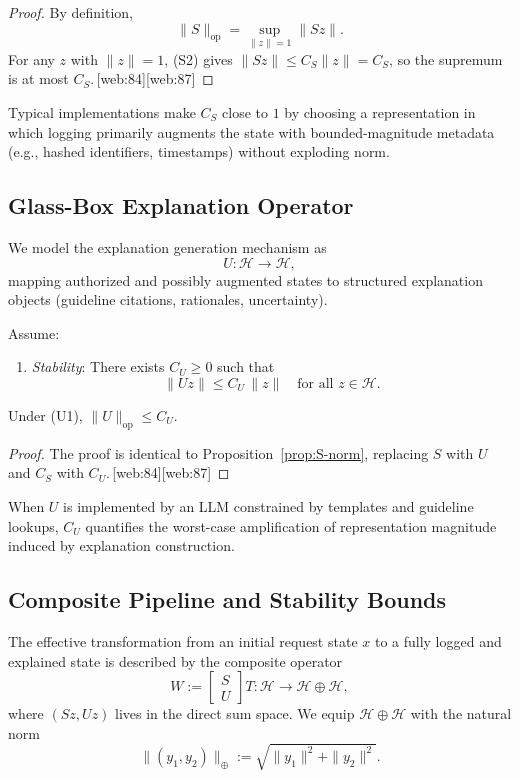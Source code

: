 \documentclass[11pt]{article}
\begin{document}
\begin{proof}
By definition,
\[
  \|S\|_{\mathrm{op}} = \sup_{\|z\| = 1} \|S z\|.
\]
For any $z$ with $\|z\| = 1$, (S2) gives $\|S z\| \le C_S \|z\| = C_S$, so the supremum is at most $C_S$.\,[web:84][web:87]
\end{proof}

Typical implementations make $C_S$ close to $1$ by choosing a representation in which logging primarily augments the state with bounded-magnitude metadata (e.g., hashed identifiers, timestamps) without exploding norm.

\subsection{Glass-Box Explanation Operator}

We model the explanation generation mechanism as
\[
  U : \mathcal{H} \to \mathcal{H},
\]
mapping authorized and possibly augmented states to structured explanation objects (guideline citations, rationales, uncertainty).

Assume:

\begin{enumerate}[label=(U\arabic*), nosep]
  \item \emph{Stability}: There exists $C_U \ge 0$ such that
  \[
    \|U z\| \le C_U \, \|z\| \quad \text{for all } z \in \mathcal{H}.
  \]
\end{enumerate}

\begin{proposition}
\label{prop:U-norm}
Under \textnormal{(U1)}, $\|U\|_{\mathrm{op}} \le C_U$.
\end{proposition}

\begin{proof}
The proof is identical to Proposition~\ref{prop:S-norm}, replacing $S$ with $U$ and $C_S$ with $C_U$.\,[web:84][web:87]
\end{proof}

When $U$ is implemented by an LLM constrained by templates and guideline lookups, $C_U$ quantifies the worst-case amplification of representation magnitude induced by explanation construction.

\subsection{Composite Pipeline and Stability Bounds}

The effective transformation from an initial request state $x$ to a fully logged and explained state is described by the composite operator
\[
  W := \begin{bmatrix} S \\ U \end{bmatrix} T : \mathcal{H} \to \mathcal{H} \oplus \mathcal{H},
\]
where $(S z, U z)$ lives in the direct sum space. 
We equip $\mathcal{H} \oplus \mathcal{H}$ with the natural norm
\[
  \|(y_1, y_2)\|_{\oplus} := \sqrt{\|y_1\|^2 + \|y_2\|^2}.
\]
\end{document}
